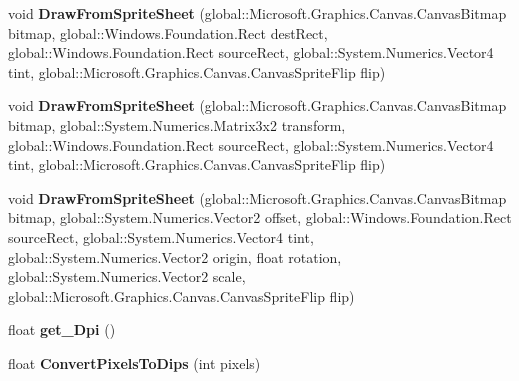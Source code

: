\begin{DoxyCompactItemize}
\mbox{\label{class_microsoft_1_1_graphics_1_1_canvas_1_1_canvas_sprite_batch_a1a86d8b0f90e3534b1f78de4ab54d5b6}} 
void {\bfseries Draw\+From\+Sprite\+Sheet} (global\+::\+Microsoft.\+Graphics.\+Canvas.\+Canvas\+Bitmap bitmap, global\+::\+Windows.\+Foundation.\+Rect dest\+Rect, global\+::\+Windows.\+Foundation.\+Rect source\+Rect, global\+::\+System.\+Numerics.\+Vector4 tint, global\+::\+Microsoft.\+Graphics.\+Canvas.\+Canvas\+Sprite\+Flip flip)
\item 
\mbox{\label{class_microsoft_1_1_graphics_1_1_canvas_1_1_canvas_sprite_batch_afb583c7529206d1438558f6816c5e862}} 
void {\bfseries Draw\+From\+Sprite\+Sheet} (global\+::\+Microsoft.\+Graphics.\+Canvas.\+Canvas\+Bitmap bitmap, global\+::\+System.\+Numerics.\+Matrix3x2 transform, global\+::\+Windows.\+Foundation.\+Rect source\+Rect, global\+::\+System.\+Numerics.\+Vector4 tint, global\+::\+Microsoft.\+Graphics.\+Canvas.\+Canvas\+Sprite\+Flip flip)
\item 
\mbox{\label{class_microsoft_1_1_graphics_1_1_canvas_1_1_canvas_sprite_batch_adf9c3f59de40a640884b277dc8f5f51e}} 
void {\bfseries Draw\+From\+Sprite\+Sheet} (global\+::\+Microsoft.\+Graphics.\+Canvas.\+Canvas\+Bitmap bitmap, global\+::\+System.\+Numerics.\+Vector2 offset, global\+::\+Windows.\+Foundation.\+Rect source\+Rect, global\+::\+System.\+Numerics.\+Vector4 tint, global\+::\+System.\+Numerics.\+Vector2 origin, float rotation, global\+::\+System.\+Numerics.\+Vector2 scale, global\+::\+Microsoft.\+Graphics.\+Canvas.\+Canvas\+Sprite\+Flip flip)
\item 
\mbox{\label{class_microsoft_1_1_graphics_1_1_canvas_1_1_canvas_sprite_batch_ac7c3fcb4f10743d465779d1001600913}} 
float {\bfseries get\+\_\+\+Dpi} ()
\item 
\mbox{\label{class_microsoft_1_1_graphics_1_1_canvas_1_1_canvas_sprite_batch_a892b10eda90f5263ebc1628954d0baf9}} 
float {\bfseries Convert\+Pixels\+To\+Dips} (int pixels)
\item 
\mbox{\label{class_microsoft_1_1_graphics_1_1_canvas_1_1_canvas_sprite_batch_ad29355a30ec2c41afbec5c8728561010}} 

\end{DoxyCompactItemize}
